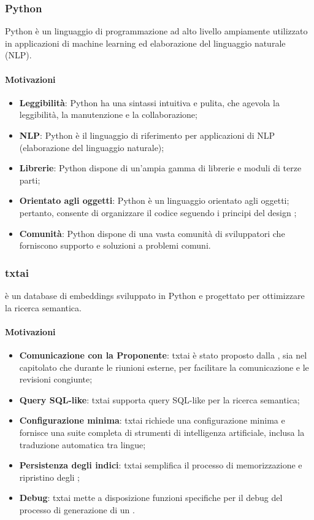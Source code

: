 \subsubsection{Python}\label{sec:Python}
\par Python è un linguaggio di programmazione ad alto livello ampiamente utilizzato in applicazioni di machine learning ed elaborazione del linguaggio naturale (NLP).
\paragraph*{Motivazioni}
\begin{itemize}
  \item \textbf{Leggibilità}: Python ha una sintassi intuitiva e pulita, che agevola la leggibilità, la manutenzione e la collaborazione;
  \item \textbf{NLP}: Python è il linguaggio di riferimento per applicazioni di NLP (elaborazione del linguaggio naturale);
  \item \textbf{Librerie}: Python dispone di un'ampia gamma di librerie e moduli di terze parti;
  \item \textbf{Orientato agli oggetti}: Python è un linguaggio orientato agli oggetti; pertanto, consente di organizzare il codice seguendo i principi del design ;
  \item \textbf{Comunità}: Python dispone di una vasta comunità di sviluppatori che forniscono supporto e soluzioni a problemi comuni.
\end{itemize}

\subsubsection{txtai}\label{sec:txtai}
\par {} è un database di embeddings sviluppato in Python e progettato per ottimizzare la ricerca semantica.
\paragraph*{Motivazioni}
\begin{itemize}
  \item \textbf{Comunicazione con la Proponente}: txtai è stato proposto dalla , sia nel capitolato che durante le riunioni esterne, per facilitare la comunicazione e le revisioni congiunte;
  \item \textbf{Query SQL-like}: txtai supporta query SQL-like per la ricerca semantica;
  \item \textbf{Configurazione minima}: txtai richiede una configurazione minima e fornisce una suite completa di strumenti di intelligenza artificiale, inclusa la traduzione automatica tra lingue;
  \item \textbf{Persistenza degli indici}: txtai semplifica il processo di memorizzazione e ripristino degli ;
  \item \textbf{Debug}: txtai mette a disposizione funzioni specifiche per il debug del processo di generazione di un .
\end{itemize}

